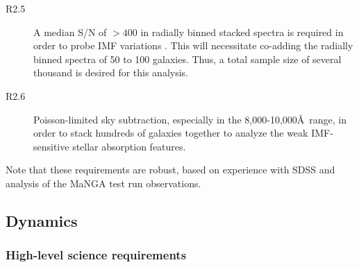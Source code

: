 \documentclass[preprint,11pt]{aastex}
\begin{document}
\begin{description}
\item[R2.5] A median S/N of $>400$ in radially binned stacked spectra
  is required in order to probe IMF variations \citep{ferreras2013}.
  This will necessitate co-adding the radially binned spectra of 50 to
  100 galaxies.  Thus, a total sample size of several thousand is desired
  for this analysis.

\item[R2.6] Poisson-limited sky subtraction, especially in the
  8,000-10,000\AA\ range, in order to stack hundreds of galaxies
  together to analyze the weak IMF-sensitive stellar absorption
  features.


\end{description}

Note that these requirements are robust, based on experience
with SDSS and analysis of the MaNGA test run observations.

\subsection{Dynamics} \label{sec:dynamical_state}

\subsubsection{High-level science requirements}

\end{document}
